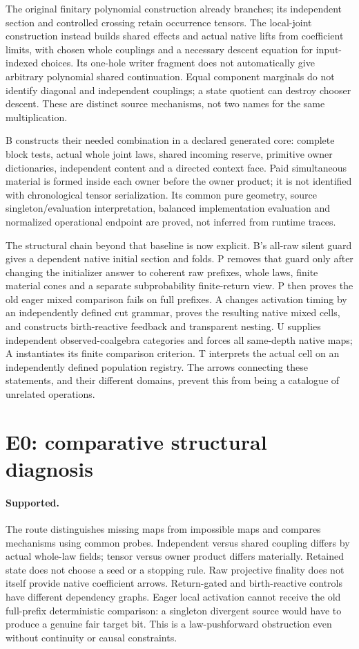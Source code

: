 \documentclass[11pt]{article}
\begin{document}
The original finitary polynomial construction already branches; its independent section and controlled crossing retain occurrence tensors. The local-joint construction instead builds shared effects and actual native lifts from coefficient limits, with chosen whole couplings and a necessary descent equation for input-indexed choices. Its one-hole writer fragment does not automatically give arbitrary polynomial shared continuation. Equal component marginals do not identify diagonal and independent couplings; a state quotient can destroy chooser descent. These are distinct source mechanisms, not two names for the same multiplication.

B constructs their needed combination in a declared generated core: complete block tests, actual whole joint laws, shared incoming reserve, primitive owner dictionaries, independent content and a directed context face. Paid simultaneous material is formed inside each owner before the owner product; it is not identified with chronological tensor serialization. Its common pure geometry, source singleton/evaluation interpretation, balanced implementation evaluation and normalized operational endpoint are proved, not inferred from runtime traces.

The structural chain beyond that baseline is now explicit. B's all-raw silent guard gives a dependent native initial section and folds. P removes that guard only after changing the initializer answer to coherent raw prefixes, whole laws, finite material cones and a separate subprobability finite-return view. P then proves the old eager mixed comparison fails on full prefixes. A changes activation timing by an independently defined cut grammar, proves the resulting native mixed cells, and constructs birth-reactive feedback and transparent nesting. U supplies independent observed-coalgebra categories and forces all same-depth native maps; A instantiates its finite comparison criterion. T interprets the actual cell on an independently defined population registry. The arrows connecting these statements, and their different domains, prevent this from being a catalogue of unrelated operations.

\section{E0: comparative structural diagnosis}
\paragraph{Supported.} The route distinguishes missing maps from impossible maps and compares mechanisms using common probes. Independent versus shared coupling differs by actual whole-law fields; tensor versus owner product differs materially. Retained state does not choose a seed or a stopping rule. Raw projective finality does not itself provide native coefficient arrows. Return-gated and birth-reactive controls have different dependency graphs. Eager local activation cannot receive the old full-prefix deterministic comparison: a singleton divergent source would have to produce a genuine fair target bit. This is a law-pushforward obstruction even without continuity or causal constraints.
\end{document}
